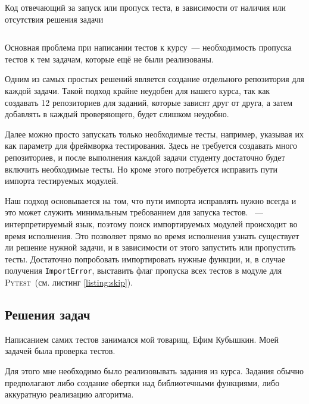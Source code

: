 \begin{listing}[b]
    \caption{Код отвечающий за запуск или пропуск теста, в зависимости от наличия или отсутствия решения задачи}
    \inputminted[linenos, breaklines, frame=single, fontsize = \small]{python3}{figures/minimal_example.py}
    \label{listing:skip}
\end{listing}

Основная проблема при написании тестов к курсу~--- необходимость пропуска тестов к тем задачам, которые ещё не были реализованы.

Одним из самых простых решений является создание отдельного репозитория для каждой задачи.
Такой подход крайне неудобен для нашего курса, так как создавать 12 репозиториев для заданий, которые зависят друг от друга, а затем добавлять в каждый проверяющего, будет слишком неудобно.

Далее можно просто запускать только необходимые тесты, например, указывая их как параметр для фреймворка тестирования.
Здесь не требуется создавать много репозиториев, и после выполнения каждой задачи студенту достаточно будет включить необходимые тесты.
Но кроме этого потребуется исправить пути импорта тестируемых модулей.

Наш подход основывается на том, что пути импорта исправлять нужно всегда и это может служить минимальным требованием для запуска тестов.
\python{}~--- интерпретируемый язык, поэтому поиск импортируемых модулей происходит во время исполнения.
Это позволяет прямо во время исполнения узнать существует ли решение нужной задачи, и в зависимости от этого запустить или пропустить тесты.
Достаточно попробовать импортировать нужные функции, и, в случае получения \texttt{ImportError}, выставить флаг пропуска всех тестов в модуле для \textsc{Pytest}~(см. листинг \ref{listing:skip}).

\subsection{Решения задач}
\label{subsec:slns}


Написанием самих тестов занимался мой товарищ, Ефим Кубышкин.
Моей задачей была проверка тестов.

Для этого мне необходимо было реализовывать задания из курса.
Задания обычно предполагают либо создание обертки над библиотечными функциями, либо аккуратную реализацию алгоритма.

